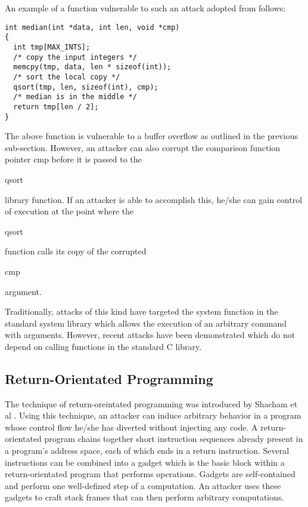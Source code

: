 An example of a function vulnerable to such an attack adopted from \cite{erlingsson-07} follows:

\begin{mylisting}
\begin{verbatim}
int median(int *data, int len, void *cmp)
{
  int tmp[MAX_INTS];
  /* copy the input integers */
  memcpy(tmp, data, len * sizeof(int));
  /* sort the local copy */
  qsort(tmp, len, sizeof(int), cmp);
  /* median is in the middle */
  return tmp[len / 2];
}
\end{verbatim}
\end{mylisting}

The above function is vulnerable to a buffer overflow as outlined in the previous sub-section.
However, an attacker can also corrupt the comparison function pointer cmp before it is passed to the
\begin{em}qsort\end{em} library function. If an attacker is able to accomplish this, he/she can gain control of
execution at the point where the \begin{em}qsort\end{em} function calls its copy of the corrupted
\begin{em}cmp\end{em} argument.

Traditionally, attacks of this kind have targeted the system function in the standard system library
which allows the execution of an arbitrary command with arguments. However, recent attacks have been
demonstrated which do not depend on calling functions in the standard C library. 

\subsection{Return-Orientated Programming}

The technique of return-oreintated programming was introduced by Shacham et al \cite{}. Using this
technique, an attacker can induce arbitrary behavior in a program whose control flow he/she has
diverted without injecting any code. A return-orientated program chains together short instruction
sequences already present in a program's address space, each of which ends in a return instruction.
Several instructions can be combined into a gadget which is the basic block within a
return-orientated program that performs operations. Gadgets are self-contained and perform one
well-defined step of a computation. An attacker uses these gadgets to craft stack frames that can
then perform arbitrary computations. 


